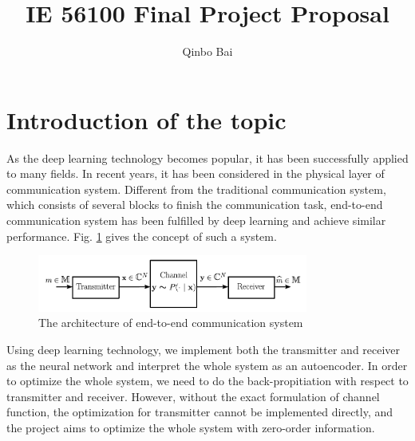 \documentclass[12pt,a4paper]{article}
\title{IE 56100 Final Project Proposal}
\author{Qinbo Bai}
\date{}
\begin{document}
	\maketitle
	\section{Introduction of the topic}
	\noindent
	\par As the deep learning technology becomes popular, it has been successfully applied to many fields. In recent years, it has been considered in the physical layer of communication system. Different from the traditional communication system, which consists of several blocks to finish the communication task, end-to-end communication system has been fulfilled by deep learning and achieve similar performance. Fig. \ref{end2end} gives the concept of such a system.
	\begin{figure}[h] \label{end2end}
		\centering
		\includegraphics[width=3.5in]{end2end.png}
		\caption{The architecture of end-to-end communication system}
	\end{figure}
	\par Using deep learning technology, we implement both the transmitter and receiver as the neural network and interpret the whole system as an autoencoder. In order to optimize the whole system, we need to do the back-propitiation with respect to transmitter and receiver. However, without the exact formulation of channel function, the optimization for transmitter cannot be implemented directly, and the project aims to optimize the whole system with zero-order information.
\end{document}
